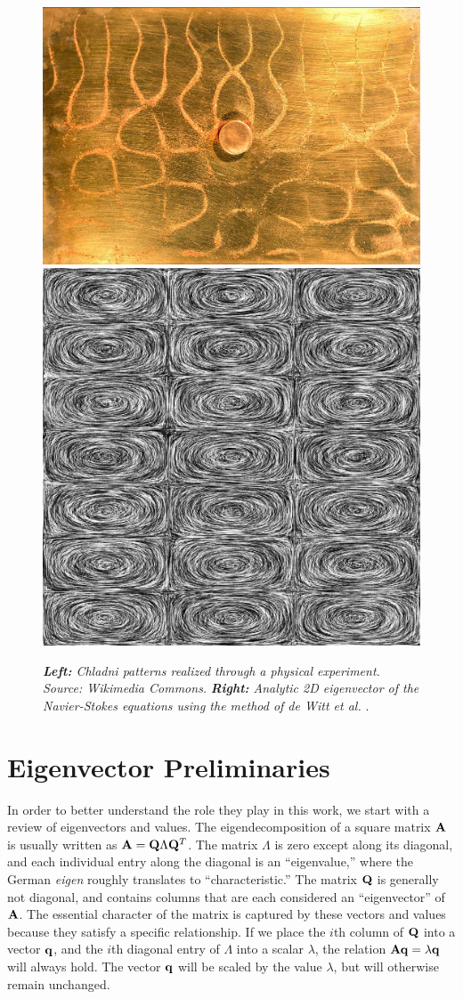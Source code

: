 \documentclass[11pt]{article}
\begin{document}
\begin{figure}
		\centering
		\includegraphics[height=0.3\textwidth]{Figures/chladni_plate.jpg}
		\includegraphics[height=0.3\textwidth]{Figures/LIC.jpg}
		\caption{{\em{\bf Left:} Chladni patterns realized through a physical experiment. Source: Wikimedia Commons.} {\em{\bf Right:} Analytic 2D eigenvector of the Navier-Stokes equations using the method of de Witt et al.} \cite{deWitt:2012}.}
		\label{fig:chladni-plate}
\end{figure}

\section*{Eigenvector Preliminaries}
In order to better understand the role they play in this work, we start with a review of eigenvectors and values. The eigendecomposition of a square matrix $\mathbf{A}$ is usually written as $\mathbf{A} = \mathbf{Q} \Lambda \mathbf{Q}^T$. The matrix $\Lambda$ is zero except along its diagonal, and each individual entry along the diagonal is an ``eigenvalue,'' where the German {\em eigen} roughly translates to ``characteristic.'' The matrix $\mathbf{Q}$ is generally not diagonal, and contains columns that are each considered an ``eigenvector'' of $\mathbf{A}$. The essential character of the matrix is captured by these vectors and values because they satisfy a specific relationship. If we place the $i$th column of $\mathbf{Q}$ into a vector $\mathbf{q}$, and the $i$th diagonal entry of $\Lambda$ into a scalar $\lambda$, the relation $\mathbf{A} \mathbf{q} = \lambda \mathbf{q}$ will always hold. The vector $\mathbf{q}$ will be scaled by the value $\lambda$, but will otherwise remain unchanged.
\end{document}
